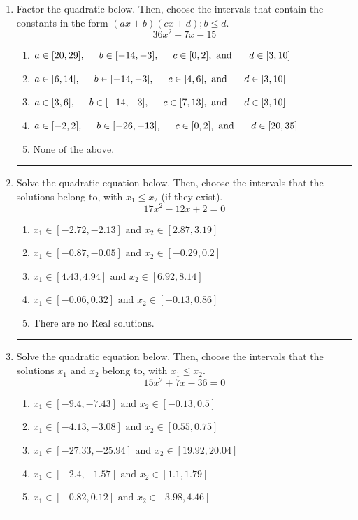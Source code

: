 \documentclass[14pt]{extbook}
\newcommand{\litem}[1]{\item#1\hspace*{-1cm}\rule{\textwidth}{0.4pt}}
\begin{document}
\begin{enumerate}
{\begin{enumerate}[label=\Alph*.]
\end{enumerate} }
\litem{
Factor the quadratic below. Then, choose the intervals that contain the constants in the form $(ax+b)(cx+d); b \leq d.$\[ 36x^{2} +7 x -15 \]\begin{enumerate}[label=\Alph*.]
\item \( a \in [20, 29], \hspace*{5mm} b \in [-14, -3], \hspace*{5mm} c \in [0, 2], \text{ and } \hspace*{5mm} d \in [3, 10] \)
\item \( a \in [6, 14], \hspace*{5mm} b \in [-14, -3], \hspace*{5mm} c \in [4, 6], \text{ and } \hspace*{5mm} d \in [3, 10] \)
\item \( a \in [3, 6], \hspace*{5mm} b \in [-14, -3], \hspace*{5mm} c \in [7, 13], \text{ and } \hspace*{5mm} d \in [3, 10] \)
\item \( a \in [-2, 2], \hspace*{5mm} b \in [-26, -13], \hspace*{5mm} c \in [0, 2], \text{ and } \hspace*{5mm} d \in [20, 35] \)
\item \( \text{None of the above.} \)

\end{enumerate} }
\litem{
Solve the quadratic equation below. Then, choose the intervals that the solutions belong to, with $x_1 \leq x_2$ (if they exist).\[ 17x^{2} -12 x + 2 = 0 \]\begin{enumerate}[label=\Alph*.]
\item \( x_1 \in [-2.72, -2.13] \text{ and } x_2 \in [2.87, 3.19] \)
\item \( x_1 \in [-0.87, -0.05] \text{ and } x_2 \in [-0.29, 0.2] \)
\item \( x_1 \in [4.43, 4.94] \text{ and } x_2 \in [6.92, 8.14] \)
\item \( x_1 \in [-0.06, 0.32] \text{ and } x_2 \in [-0.13, 0.86] \)
\item \( \text{There are no Real solutions.} \)

\end{enumerate} }
\litem{
Solve the quadratic equation below. Then, choose the intervals that the solutions $x_1$ and $x_2$ belong to, with $x_1 \leq x_2$.\[ 15x^{2} +7 x -36 = 0 \]\begin{enumerate}[label=\Alph*.]
\item \( x_1 \in [-9.4, -7.43] \text{ and } x_2 \in [-0.13, 0.5] \)
\item \( x_1 \in [-4.13, -3.08] \text{ and } x_2 \in [0.55, 0.75] \)
\item \( x_1 \in [-27.33, -25.94] \text{ and } x_2 \in [19.92, 20.04] \)
\item \( x_1 \in [-2.4, -1.57] \text{ and } x_2 \in [1.1, 1.79] \)
\item \( x_1 \in [-0.82, 0.12] \text{ and } x_2 \in [3.98, 4.46] \)


\end{enumerate}}
\end{enumerate}
\end{document}
